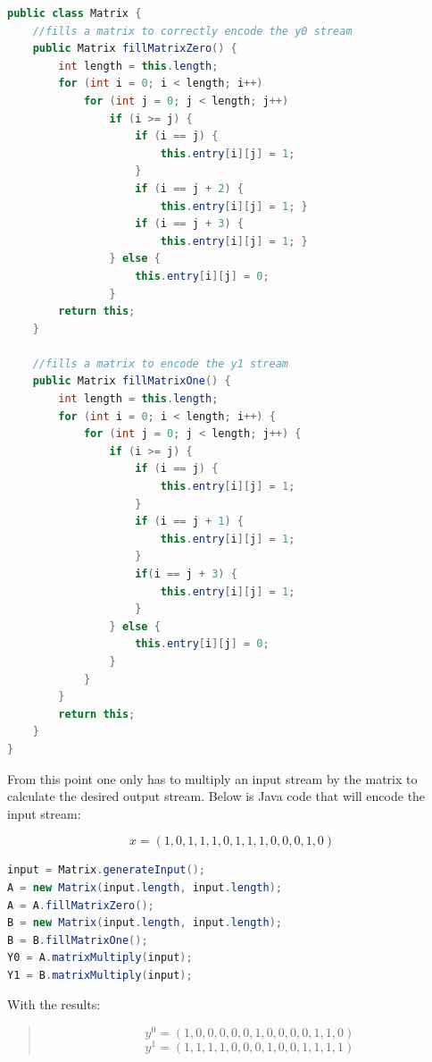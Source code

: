 \documentclass[letterpaper,12pt]{article}
\begin{document}
\lstset{caption=Creating the Matrices Necessary for Part Two}
\begin{lstlisting}[language=java]
public class Matrix {    
    //fills a matrix to correctly encode the y0 stream    
    public Matrix fillMatrixZero() {
        int length = this.length;
        for (int i = 0; i < length; i++)
            for (int j = 0; j < length; j++)
                if (i >= j) {
                    if (i == j) {
                        this.entry[i][j] = 1;
                    }
                    if (i == j + 2) {
                        this.entry[i][j] = 1; }
                    if (i == j + 3) {
                        this.entry[i][j] = 1; }
                } else {
                    this.entry[i][j] = 0;
                }
        return this;
    }
    
    //fills a matrix to encode the y1 stream
    public Matrix fillMatrixOne() {
        int length = this.length;
        for (int i = 0; i < length; i++) {
            for (int j = 0; j < length; j++) {
                if (i >= j) {
                    if (i == j) {
                        this.entry[i][j] = 1;
                    }
                    if (i == j + 1) {
                        this.entry[i][j] = 1;
                    }
                    if(i == j + 3) {
                        this.entry[i][j] = 1;
                    }
                } else {
                    this.entry[i][j] = 0;
                }
            }
        }
        return this;
    }
}
\end{lstlisting}

From this point one only has to multiply an input stream by the matrix to
calculate the desired output stream.
Below is Java code that will encode the input stream: 

\[ x = (1, 0, 1, 1, 1, 0, 1, 1, 1, 0, 0, 0, 1, 0) \]

\lstset{caption=Encoding the Stream}
\begin{lstlisting}[language=java]
input = Matrix.generateInput();
A = new Matrix(input.length, input.length);
A = A.fillMatrixZero();
B = new Matrix(input.length, input.length);
B = B.fillMatrixOne();
Y0 = A.matrixMultiply(input);
Y1 = B.matrixMultiply(input);
\end{lstlisting}

With the results:

\begin{quote}
\[y^0 = (1, 0, 0, 0, 0, 0, 1, 0, 0, 0, 0, 1, 1, 0)\]
\[y^1 = (1, 1, 1, 1, 0, 0, 0, 1, 0, 0, 1, 1, 1, 1)\]
\end{quote}
\end{document}
